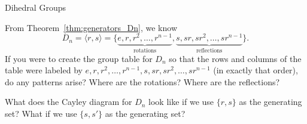 \begin{section}{Dihedral Groups}
\begin{problem}
From Theorem~\ref{thm:generators_Dn}, we know
\[
D_n=\langle r,s\rangle =\{\underbrace{e,r,r^2,\ldots, r^{n-1}}_{\text{rotations}},\underbrace{s,sr,sr^2,\ldots,sr^{n-1}}_{\text{reflections}}\}.
\]
If you were to create the group table for $D_n$ so that the rows and columns of the table were labeled by $e,r,r^2,\ldots, r^{n-1},s,sr,sr^2,\ldots,sr^{n-1}$ (in exactly that order), do any patterns arise?  Where are the rotations? Where are the reflections?
\end{problem}

\begin{problem}
What does the Cayley diagram for $D_n$ look like if we use $\{r,s\}$ as the generating set?  What if we use $\{s,s'\}$ as the generating set?
\end{problem}

\end{section}

